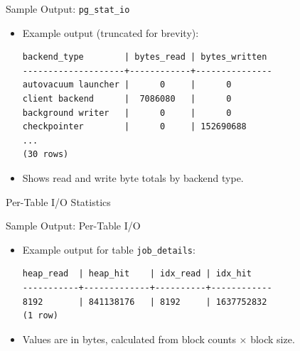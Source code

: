 \documentclass[aspectratio=169]{beamer}
\begin{document}
\begin{frame}[fragile]{Sample Output: \texttt{pg\_stat\_io}}
\begin{itemize}
    \item Example output (truncated for brevity):
\begin{verbatim}
backend_type        | bytes_read | bytes_written
--------------------+------------+---------------
autovacuum launcher |      0     |      0
client backend      |  7086080   |      0
background writer   |      0     |      0
checkpointer        |      0     | 152690688
...
(30 rows)
\end{verbatim}
    \item Shows read and write byte totals by backend type.
\end{itemize}
\end{frame}

\begin{frame}[fragile]{Per-Table I/O Statistics}
\end{frame}

\begin{frame}[fragile]{Sample Output: Per-Table I/O}
\begin{itemize}
    \item Example output for table \texttt{job\_details}:
\begin{verbatim}
heap_read  | heap_hit    | idx_read | idx_hit
-----------+-------------+----------+------------
8192       | 841138176   | 8192     | 1637752832
(1 row)
\end{verbatim}
    \item Values are in bytes, calculated from block counts × block size.
\end{itemize}
\end{frame}
\end{document}
